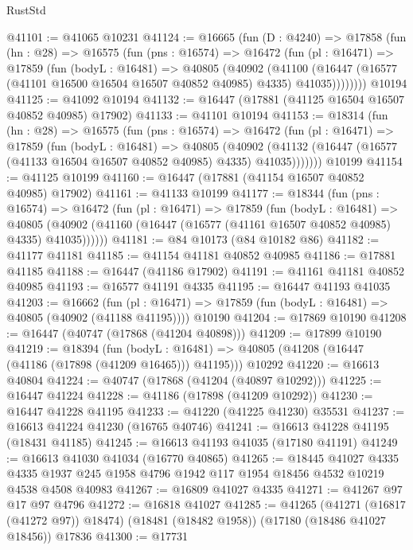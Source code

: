 \begin{lexlean}{RustStd}
\begin{coremodule}
{\begin{coremodule}
{{{{{{{{{{{{{{{{{{{{{{{{{{{{{{{{{{{{{{{{{{{{{{{{{{{{{{{@41101 := @41065 @10231
@41124 := @16665
    (fun (D : @4240) =>
    @17858
      (fun (hn : @28) =>
      @16575
        (fun (pns : @16574) =>
        @16472
          (fun (pl : @16471) =>
          @17859
            (fun (bodyL : @16481) =>
            @40805
              (@40902
                (@41100
                  (@16447 (@16577 (@41101 @16500 @16504 @16507 @40852 @40985) @4335) @41035))))))))
    @10194
@41125 := @41092 @10194
@41132 := @16447 (@17881 (@41125 @16504 @16507 @40852 @40985) @17902)
@41133 := @41101 @10194
@41153 := @18314
    (fun (hn : @28) =>
    @16575
      (fun (pns : @16574) =>
      @16472
        (fun (pl : @16471) =>
        @17859
          (fun (bodyL : @16481) =>
          @40805
            (@40902
              (@41132 (@16447 (@16577 (@41133 @16504 @16507 @40852 @40985) @4335) @41035)))))))
    @10199
@41154 := @41125 @10199
@41160 := @16447 (@17881 (@41154 @16507 @40852 @40985) @17902)
@41161 := @41133 @10199
@41177 := @18344
    (fun (pns : @16574) =>
    @16472
      (fun (pl : @16471) =>
      @17859
        (fun (bodyL : @16481) =>
        @40805 (@40902 (@41160 (@16447 (@16577 (@41161 @16507 @40852 @40985) @4335) @41035))))))
@41181 := @84 @10173 (@84 @10182 @86)
@41182 := @41177 @41181
@41185 := @41154 @41181 @40852 @40985
@41186 := @17881 @41185
@41188 := @16447 (@41186 @17902)
@41191 := @41161 @41181 @40852 @40985
@41193 := @16577 @41191 @4335
@41195 := @16447 @41193 @41035
@41203 := @16662
    (fun (pl : @16471) => @17859 (fun (bodyL : @16481) => @40805 (@40902 (@41188 @41195))))
    @10190
@41204 := @17869 @10190
@41208 := @16447 (@40747 (@17868 (@41204 @40898)))
@41209 := @17899 @10190
@41219 := @18394
    (fun (bodyL : @16481) => @40805 (@41208 (@16447 (@41186 (@17898 (@41209 @16465))) @41195)))
    @10292
@41220 := @16613 @40804
@41224 := @40747 (@17868 (@41204 (@40897 @10292)))
@41225 := @16447 @41224
@41228 := @41186 (@17898 (@41209 @10292))
@41230 := @16447 @41228 @41195
@41233 := @41220 (@41225 @41230) @35531
@41237 := @16613 @41224 @41230 (@16765 @40746)
@41241 := @16613 @41228 @41195 (@18431 @41185)
@41245 := @16613 @41193 @41035 (@17180 @41191)
@41249 := @16613 @41030 @41034 (@16770 @40865)
@41265 := @18445
    @41027
    @4335
    @4335
    @1937
    @245
    @1958
    @4796
    @1942
    @117
    @1954
    @18456
    @4532
    @10219
    @4538
    @4508
    @40983
@41267 := @16809 @41027 @4335
@41271 := @41267 @97 @17 @97 @4796
@41272 := @16818 @41027
@41285 := @41265
    (@41271 (@16817 (@41272 @97)) @18474)
    (@18481 (@18482 @1958))
    (@17180 (@18486 @41027 @18456))
    @17836
@41300 := @17731
}}}}}}}}}}}}}}}}}}}}}}}}}}}}}}}}}}}}}}}}}}}}}}}}}}}}}}}
\end{coremodule}}
\end{coremodule}
\end{lexlean}
